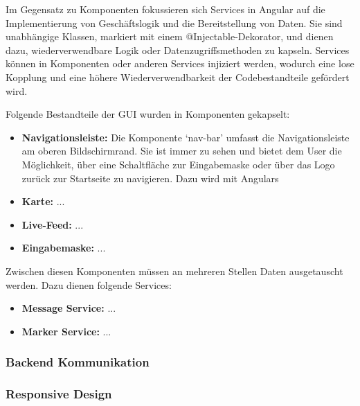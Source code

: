 \documentclass[../main.tex]{subfiles} %
\begin{document}
Im Gegensatz zu Komponenten fokussieren sich Services in Angular auf die Implementierung von Geschäftslogik und die Bereitstellung von Daten. 
Sie sind unabhängige Klassen, markiert mit einem @Injectable-Dekorator, und dienen dazu, wiederverwendbare Logik oder Datenzugriffsmethoden zu 
kapseln. Services können in Komponenten oder anderen Services injiziert werden, wodurch eine lose Kopplung und eine höhere Wiederverwendbarkeit 
der Codebestandteile gefördert wird.

Folgende Bestandteile der GUI wurden in Komponenten gekapselt:

\begin{itemize}

	\item \textbf{Navigationsleiste:}
	      Die Komponente `nav-bar' umfasst die Navigationsleiste am oberen Bildschirmrand. Sie ist immer zu sehen und bietet dem User die Möglichkeit,
        über eine Schaltfläche zur Eingabemaske oder über das Logo zurück zur Startseite zu navigieren. Dazu wird mit Angulars 

  \item \textbf{Karte:}
        ...

  \item \textbf{Live-Feed:}
        ...

  \item \textbf{Eingabemaske:}
        ...

\end{itemize}

Zwischen diesen Komponenten müssen an mehreren Stellen Daten ausgetauscht werden. Dazu dienen folgende Services:

\begin{itemize}

	\item \textbf{Message Service:}
	      ...

  \item \textbf{Marker Service:}
        ...

\end{itemize}

\subsubsection{Backend Kommunikation}

\subsubsection{Responsive Design}
\end{document}
